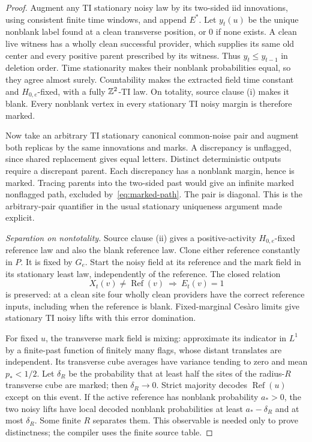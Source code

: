 \begin{proof}
Augment any TI stationary noisy law by its two-sided iid innovations,
using consistent finite time windows, and append \(E^*\).
Let \(y_t(u)\) be the unique nonblank label found at a clean
transverse position, or \(0\) if none exists. A clean live witness
has a wholly clean successful provider, which supplies its same
old center and every positive parent prescribed by its witness.
Thus \(y_t\le y_{t-1}\) in deletion order. Time stationarity makes
their nonblank probabilities equal, so they agree almost surely.
Countability makes the extracted field time constant and
\(H_{0,e}\)-fixed, with a fully \(\mathbb Z^2\)-TI law.
On totality, source clause (i) makes it blank. Every nonblank
vertex in every stationary TI noisy margin is therefore marked.

Now take an arbitrary TI stationary canonical common-noise pair
and augment both replicas by the same innovations and marks.
A discrepancy is unflagged, since shared replacement gives equal
letters. Distinct deterministic outputs require a discrepant
parent. Each discrepancy has a nonblank margin, hence is marked.
Tracing parents into the two-sided past would give an infinite
marked nonflagged path, excluded by~\eqref{eq:marked-path}.
The pair is diagonal. This is the arbitrary-pair quantifier in
the usual stationary uniqueness argument made explicit.

\emph{Separation on nontotality.}
Source clause (ii) gives a positive-activity \(H_{0,e}\)-fixed
reference law and also the blank reference law. Clone either
reference constantly in \(P\). It is fixed by \(G_e\).
Start the noisy field at its reference and the mark field in its
stationary least law, independently of the reference. The closed
relation
\[
 X_t(v)\ne\operatorname{Ref}(v)\ \Longrightarrow\ E_t(v)=1
\]
is preserved: at a clean site four wholly clean providers have
the correct reference inputs, including when the reference is
blank. Fixed-marginal Ces\`aro limits give stationary TI noisy
lifts with this error domination.

For fixed \(u\), the transverse mark field is mixing: approximate
its indicator in \(L^1\) by a finite-past function of finitely many
flags, whose distant translates are independent. Its transverse
cube averages have variance tending to zero and mean \(p_*<1/2\).
Let \(\delta_R\) be the probability that at least half the sites
of the radius-\(R\) transverse cube are marked; then
\(\delta_R\to0\). Strict majority decodes \(\operatorname{Ref}(u)\)
except on this event. If the active reference has nonblank
probability \(a_*>0\), the two noisy lifts have local decoded
nonblank probabilities at least \(a_*-\delta_R\) and at most
\(\delta_R\). Some finite \(R\) separates them. This observable
is needed only to prove distinctness; the compiler uses the
finite source table.
\end{proof}


